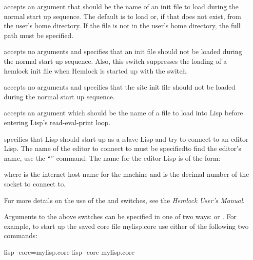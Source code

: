 \begin{Lentry}
\item[\code{-init}] accepts an argument that should be the name of an
  init file to load during the normal start up sequence.  The default
  is to load  or, if that does not exist,
   from the user's home directory.  If the file is not
  in the user's home directory, the full path must be specified.
  
\item[\code{-noinit}] accepts no arguments and specifies that an init
  file should not be loaded during the normal start up sequence.
  Also, this switch suppresses the loading of a hemlock init file when
  Hemlock is started up with the  switch.

\item[\code{-nositeinit}] accepts no arguments and specifies that the
  site init file should not be loaded during the normal start up
  sequence. 

\item[\code{-load}] accepts an argument which should be the name of a
  file to load into Lisp before entering Lisp's read-eval-print loop.
  
\item[\code{-slave}] specifies that Lisp should start up as a
  \i{slave} Lisp and try to connect to an editor Lisp.  The name of
  the editor to connect to must be specified\dash{}to find the
  editor's name, use the \hemlock{} ``'' command.  The name for the editor Lisp is of the
  form:
  \begin{example}
    \code{:}
  \end{example}
  where  is the internet host name for the machine
  and  is the decimal number of the socket to connect to.
\end{Lentry}

For more details on the use of the  and 
switches, see the {\it Hemlock User's Manual}.

Arguments to the above switches can be specified in one of two ways:
 or
.  For example, to start up
the saved core file mylisp.core use either of the following two
commands:

\begin{example}
   lisp -core=mylisp.core
   lisp -core mylisp.core
\end{example}


